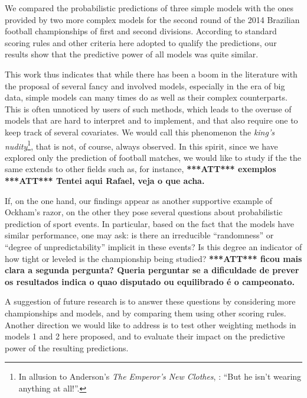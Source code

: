 \documentclass[journal,article,accept,moreauthors,pdftex,12pt,a4paper]{mdpi}
\newcommand{\red}[1]{\textbf{\color{red} ***ATT*** #1}}
\begin{document}
We compared the probabilistic predictions of three simple models with the ones provided by two more complex models for the second round of the 2014 Brazilian football championships of first and second divisions.
According to standard scoring rules and other criteria here adopted to qualify the predictions, our results show that the predictive power of all models was quite similar.

This work thus indicates that while there has been a boom in the literature with the proposal of several fancy and involved models, especially in the era of big data, simple models can many times do as well as their complex counterparts. 
This is often unnoticed by users of such methods, which leads to the overuse of models that are hard to interpret and to implement, and that also require one to keep track of several covariates.
We would call this phenomenon the {\it king's nudity}\footnote{In allusion to Anderson's {\it The Emperor's New Clothes}, \cite{emperor}: ``But he isn't wearing anything at all!''.}, that is not, of course, always observed.
In this spirit, since we have explored only the prediction of football matches, we would like to study if the the same extends to other fields such as, for instance, \red{exemplos} \red{Tentei aqui Rafael, veja o que acha.}

If, on the one hand, our findings appear as another supportive example of Ockham's razor, on the other they pose several questions about probabilistic prediction of sport events.
In particular, based on the fact that the models have similar performance, one may ask: is there an irreducible ``randomness'' or ``degree of unpredictability'' implicit in these events?
Is this degree an indicator of how tight or leveled is the championship being studied? \red{ficou mais clara a segunda pergunta? Queria perguntar se a dificuldade de prever os resultados indica o quao disputado ou equilibrado \'e o campeonato.}

A suggestion of future research is to answer these questions by considering more championships and models, and  by comparing them using other scoring rules.
Another direction we would like to address is to test other weighting methods in models 1 and 2 here proposed, and to evaluate their impact on the predictive power of the resulting predictions.


\end{document}
